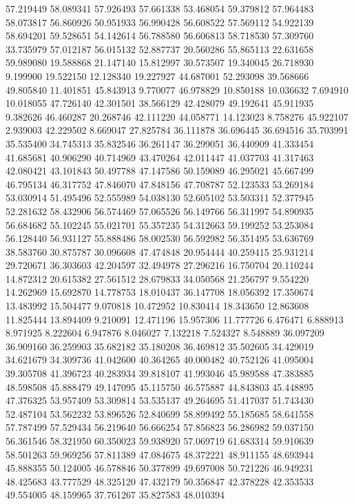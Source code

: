 57.219449
58.089341
57.926493
57.661338
53.468054
59.379812
57.964483
58.073817
56.860926
50.951933
56.990428
56.608522
57.569112
54.922139
58.694201
59.528651
54.142614
56.788580
56.606813
58.718530
57.309760
33.735979
57.012187
56.015132
52.887737
20.560286
55.865113
22.631658
59.989080
19.588868
21.147140
15.812997
30.573507
19.340045
26.718930
9.199900
19.522150
12.128340
19.227927
44.687001
52.293098
39.568666
49.805840
11.401851
45.843913
9.770077
46.978829
10.850188
10.036632
7.694910
10.018055
47.726140
42.301501
38.566129
42.428079
49.192641
45.911935
9.382626
46.460287
20.268746
42.111220
44.058771
14.123023
8.758276
45.922107
2.939003
42.229502
8.669047
27.825784
36.111878
36.696445
36.694516
35.703991
35.535400
34.745313
35.832546
36.261147
36.299051
36.440909
41.333454
41.685681
40.906290
40.714969
43.470264
42.011447
41.037703
41.317463
42.080421
43.101843
50.497788
47.147586
50.159089
46.295021
45.667499
46.795134
46.317752
47.846070
47.848156
47.708787
52.123533
53.269184
53.030914
51.495496
52.555989
54.038130
52.605102
53.503311
52.377945
52.281632
58.432906
56.574469
57.065526
56.149766
56.311997
54.890935
56.684682
55.102245
55.021701
55.357235
54.312663
59.199252
53.253084
56.128440
56.931127
55.888486
58.002530
56.592982
56.351495
53.636769
38.583760
30.875787
30.096608
47.474848
20.954444
40.259415
25.931214
29.720671
36.303603
42.204597
32.494978
27.296216
16.750704
20.110244
14.872312
20.615382
27.561512
28.679833
34.050568
21.256797
9.554220
14.262969
15.692870
14.778753
18.010437
36.147708
18.056392
17.350674
13.483992
15.504477
9.070818
10.472952
10.830414
18.343650
12.863608
11.825444
13.894409
9.210091
12.471196
15.957306
11.777726
6.476471
6.888913
8.971925
8.222604
6.947876
8.046027
7.132218
7.524327
8.548889
36.097209
36.909160
36.259903
35.682182
35.180208
36.469812
35.502605
34.429019
34.621679
34.309736
41.042600
40.364265
40.000482
40.752126
41.095004
39.305708
41.396723
40.283934
39.818107
41.993046
45.989588
47.383885
48.598508
45.888479
49.147095
45.115750
46.575887
44.843803
45.448895
47.376325
53.957409
53.309814
53.535137
49.264695
51.417037
51.743430
52.487104
53.562232
53.896526
52.840699
58.899492
55.185685
58.641558
57.787499
57.529434
56.219640
56.666254
57.856823
56.286982
59.037150
56.361546
58.321950
60.350023
59.938920
57.069719
61.683314
59.910639
58.501263
59.969256
57.811389
47.084675
48.372221
48.911155
48.693944
45.888355
50.124005
46.578846
50.377899
49.697008
50.721226
46.949231
48.425683
43.777529
48.325120
47.432179
50.356847
42.378228
42.353533
49.554005
48.159965
37.761267
35.827583
48.010394
